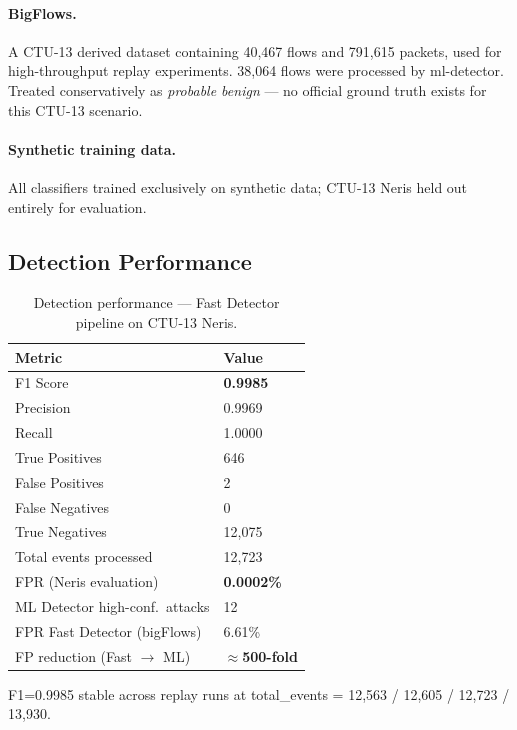 \documentclass[11pt,a4paper]{article}
\begin{document}
\paragraph{BigFlows.}
A CTU-13 derived dataset containing 40,467 flows and 791,615 packets, used for high-throughput
replay experiments. 38,064 flows were processed by ml-detector. Treated conservatively as
\emph{probable benign} --- no official ground truth exists for this CTU-13 scenario.

\paragraph{Synthetic training data.}
All classifiers trained exclusively on synthetic data; CTU-13 Neris held out entirely for
evaluation.

\subsection{Detection Performance}

\begin{table}[h]
\centering
\caption{Detection performance --- Fast Detector pipeline on CTU-13 Neris.}
\label{tab:detection}
\begin{tabular}{ll}
\toprule
\textbf{Metric} & \textbf{Value} \\
\midrule
F1 Score                       & \textbf{0.9985} \\
Precision                      & 0.9969 \\
Recall                         & 1.0000 \\
True Positives                 & 646 \\
False Positives                & 2 \\
False Negatives                & 0 \\
True Negatives                 & 12,075 \\
Total events processed         & 12,723 \\
FPR (Neris evaluation)         & \textbf{0.0002\%} \\
ML Detector high-conf.\ attacks & 12 \\
FPR Fast Detector (bigFlows)   & 6.61\% \\
FP reduction (Fast $\to$ ML)   & \textbf{${\approx}$500-fold} \\
\bottomrule
\end{tabular}
\end{table}

F1=0.9985 stable across replay runs at total\_events = 12,563 / 12,605 / 12,723 / 13,930.
\end{document}
